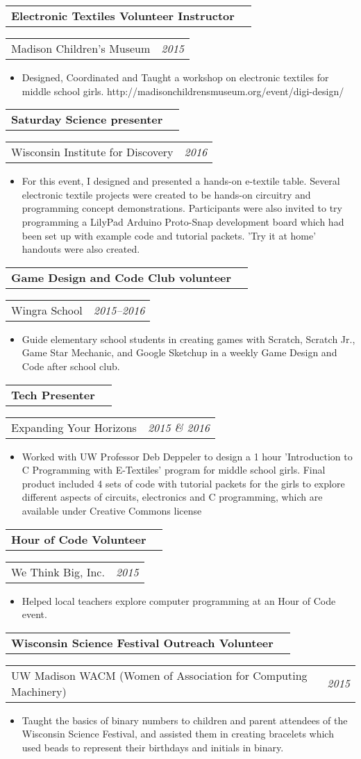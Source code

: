 \documentclass[letterpaper,11pt]{article}
\newcommand{\resitem}[1]{\item #1 \vspace{-8pt}}
\newcommand{\ressubheading}[4]{\vspace{4pt}
	\begin{tabularx}{\textwidth}{X r}
		\textbf{#1} & \textit{#4}
	\end{tabularx}

	\begin{tabularx}{\textwidth}{X r}
		#2 & \textit{#3}
	\end{tabularx}\vspace{-6pt}

}
\begin{document}
\ressubheading{Electronic Textiles Volunteer Instructor}{Madison Children's Museum}{2015}{}
\begin{itemize}
		\resitem{Designed, Coordinated and Taught a workshop on electronic textiles for middle school girls. http://madisonchildrensmuseum.org/event/digi-design/}
	\end{itemize}

\ressubheading{Saturday Science presenter}{Wisconsin Institute for Discovery}{2016}{}
\begin{itemize}
		\resitem{For this event, I designed and presented a hands-on e-textile table. Several electronic textile projects were created to be hands-on circuitry and programming concept demonstrations. Participants were also invited to try programming a LilyPad Arduino Proto-Snap development board which had been set up with example code and tutorial packets. 'Try it at home' handouts were also created.}
	\end{itemize}

\ressubheading{Game Design and Code Club volunteer}{Wingra School}{2015--2016}{}
\begin{itemize}
		\resitem{Guide elementary school students in creating games with Scratch, Scratch Jr., Game Star Mechanic, and Google Sketchup in a weekly Game Design and Code after school club.}
	\end{itemize}

\ressubheading{Tech Presenter}{Expanding Your Horizons}{2015 \& 2016}{}
\begin{itemize}
		\resitem{Worked with UW Professor Deb Deppeler to design a 1 hour 'Introduction to C Programming with E-Textiles' program for middle school girls. Final product included 4 sets of code with tutorial packets for the girls to explore different aspects of circuits, electronics and C programming, which are available under Creative Commons license}
	\end{itemize}


\ressubheading{Hour of Code Volunteer}{We Think Big, Inc.}{2015}{}
\begin{itemize}
		\resitem{Helped local teachers explore computer programming at an Hour of Code event.}
	\end{itemize}

\ressubheading{Wisconsin Science Festival Outreach Volunteer}{
UW Madison WACM (Women of Association for Computing Machinery)}{2015}{}
\begin{itemize}
		\resitem{Taught the basics of binary numbers to children and parent attendees of the Wisconsin Science Festival, and assisted them in creating bracelets which used beads to represent their birthdays and initials in binary.}
	\end{itemize}
\end{document}
